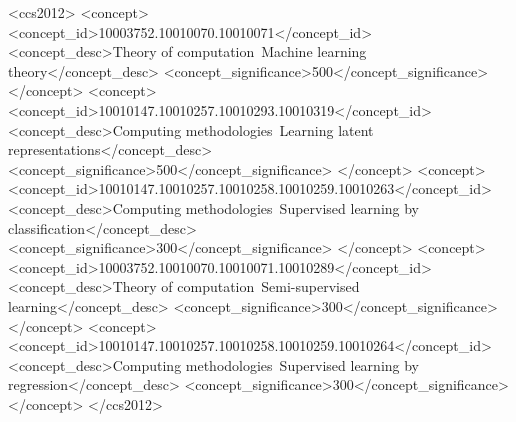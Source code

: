 \documentclass[manuscript,screen]{acmart}
\begin{document}
\begin{CCSXML}
<ccs2012>
   <concept>
       <concept_id>10003752.10010070.10010071</concept_id>
       <concept_desc>Theory of computation~Machine learning theory</concept_desc>
       <concept_significance>500</concept_significance>
       </concept>
   <concept>
       <concept_id>10010147.10010257.10010293.10010319</concept_id>
       <concept_desc>Computing methodologies~Learning latent representations</concept_desc>
       <concept_significance>500</concept_significance>
       </concept>
   <concept>
       <concept_id>10010147.10010257.10010258.10010259.10010263</concept_id>
       <concept_desc>Computing methodologies~Supervised learning by classification</concept_desc>
       <concept_significance>300</concept_significance>
    </concept>
    <concept>
        <concept_id>10003752.10010070.10010071.10010289</concept_id>
        <concept_desc>Theory of computation~Semi-supervised learning</concept_desc>
        <concept_significance>300</concept_significance>
    </concept>
    <concept>
        <concept_id>10010147.10010257.10010258.10010259.10010264</concept_id>
        <concept_desc>Computing methodologies~Supervised learning by regression</concept_desc>
        <concept_significance>300</concept_significance>
    </concept>
</ccs2012>
\end{CCSXML}









\maketitle
\end{document}
